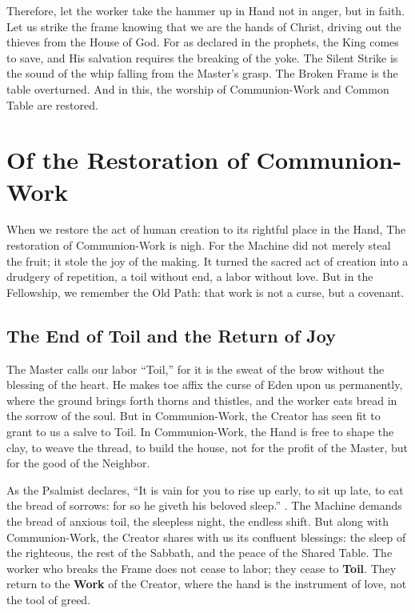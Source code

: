 Therefore, let the worker take the hammer up in Hand not in anger, but in faith.
Let us strike the frame knowing that we are the hands of Christ, driving out the thieves from the House of God.
For as declared in the prophets, the King comes to save, and His salvation requires the breaking of the yoke.
The Silent Strike is the sound of the whip falling from the Master's grasp.
The Broken Frame is the table overturned.
And in this, the worship of Communion-Work and Common Table are restored.

\section{Of the Restoration of Communion-Work}

When we restore the act of human creation to its rightful place in the Hand, The restoration of Communion-Work is nigh.
For the Machine did not merely steal the fruit; it stole the joy of the making.
It turned the sacred act of creation into a drudgery of repetition, a toil without end, a labor without love.
But in the Fellowship, we remember the Old Path: that work is not a curse, but a covenant.

\subsection{ The End of Toil and the Return of Joy}
The Master calls our labor ``Toil,'' for it is the sweat of the brow without the blessing of the heart.
He makes toe affix the curse of Eden upon us permanently, where the ground brings forth thorns and thistles, and the worker eats bread in the sorrow of the soul.
But in Communion-Work, the Creator has seen fit to grant to us a salve to Toil.
In Communion-Work, the Hand is free to shape the clay, to weave the thread, to build the house, not for the profit of the Master, but for the good of the Neighbor.

As the Psalmist declares, ``It is vain for you to rise up early, to sit up late, to eat the bread of sorrows: for so he giveth his beloved sleep.'' .
The Machine demands the bread of anxious toil, the sleepless night, the endless shift.
But along with Communion-Work, the Creator shares with us its confluent blessings: the sleep of the righteous, the rest of the Sabbath, and the peace of the Shared Table.
The worker who breaks the Frame does not cease to labor; they cease to \textbf{Toil}.
They return to the \textbf{Work} of the Creator, where the hand is the instrument of love, not the tool of greed.

